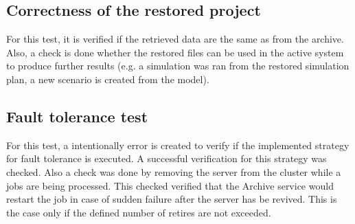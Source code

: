 \subsection{Correctness of the restored project}
For this test, it is verified if the retrieved data are the same as from the archive. Also, a check is done whether the restored files can be used in the active system
to produce further results (e.g. a simulation was ran from the restored simulation plan, a new scenario is created from the model).

\subsection{Fault tolerance test}
For this test, a intentionally error is created to verify if the implemented strategy for fault tolerance is executed. A successful verification for this
strategy was checked. Also a check was done by removing the server from the cluster while a jobs are being processed. This checked verified that the Archive service
would restart the job in case of sudden failure after the server has be revived. This is the case only if the defined number of retires are not exceeded.
